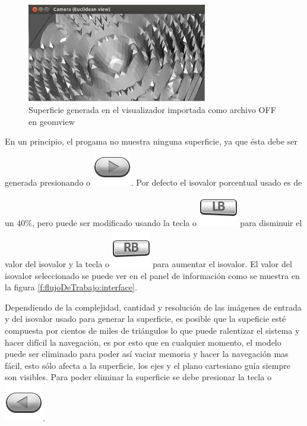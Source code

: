 \begin{figure}[!htb]
\centering
	\includegraphics[width=0.7\textwidth]{images/visualizer/geomview.png}
\caption{Superficie generada en el visualizador importada como archivo OFF en \mbox{geomview}}
\label{f:flujoDeTrabajo:geomview}
\end{figure}

\newpage
En un principio, el progama no muestra ninguna superficie, ya que ésta debe ser generada presionando  o \includegraphics[scale=0.4, trim= 0 20 0 0]{images/visualizer/xbox360/start.png}. Por defecto el isovalor porcentual usado es de un $40\%$, pero puede ser modificado usando la tecla  o \includegraphics[scale=0.4, trim= 0 20 0 0]{images/visualizer/xbox360/leftShoulder0.png} para disminuir el valor del isovalor y la tecla  o \includegraphics[scale=0.4, trim= 0 20 0 0]{images/visualizer/xbox360/rightShoulder0.png} para aumentar el isovalor. El valor del isovalor seleccionado se puede ver en el panel de información como se muestra en la figura \ref{f:flujoDeTrabajo:interface}.

Dependiendo de la complejidad, cantidad y resolución de las imágenes de entrada y del isovalor usado para generar la superficie, es posible que la supeficie esté compuesta por cientos de miles de triángulos lo que puede ralentizar el sistema y hacer difícil la navegación, es por esto que en cualquier momento, el modelo puede ser eliminado para poder así vaciar memoria y hacer la navegación mas fácil, esto sólo afecta a la superficie, los ejes y el plano cartesiano guía siempre son visibles. Para poder eliminar la superficie se debe presionar la tecla  o \includegraphics[scale=0.4, trim= 0 20 0 0]{images/visualizer/xbox360/select.png}.

